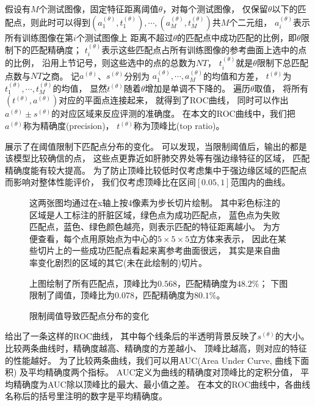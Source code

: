假设有$M$个测试图像，固定特征距离阈值$\theta$，对每个测试图像，
仅保留$\theta$以下的匹配点，则此时可以得到$(a_1^{(\theta)},
t_1^{(\theta)}),\cdots,(a_M^{(\theta)}, t_M^{(\theta)})$共$M$个二元组，
$a_i^{(\theta)}$表示所有训练图像在第$i$个测试图像上
距离不超过$\theta$的匹配点中成功匹配的比例，即$\theta$限制下的匹配精确度；
$t_i^{(\theta)}$表示这些匹配点占所有训练图像的参考曲面上选中的点的比例，
沿用上节记号，则这些选中的点的总数为$NT$，
$t_i^{(\theta)}$就是$\theta$限制下总匹配点数与$NT$之商。
记$a^{(\theta)}$、$s^{(\theta)}$分别为
$a_1^{(\theta)},\cdots,a_M^{(\theta)}$的均值和方差，
$t^{(\theta)}$为$t_1^{(\theta)},\cdots,t_M^{(\theta)}$的均值，
显然$t^{(\theta)}$随着$\theta$增加是单调不下降的。
遍历$\theta$取值，
将所有$(t^{(\theta)}, a^{(\theta)})$对应的平面点连接起来，
就得到了ROC曲线，
同时可以作出$a^{(\theta)} \pm s^{(\theta)}$的对应区域来反应评测的准确度。
在本文的ROC曲线中，我们把$a^{(\theta)}$称为精确度(precision)，
$t^{(\theta)}$称为顶峰比(top ratio)。

展示了在阈值限制下匹配点分布的变化。
可以发现，当限制阈值后，输出的都是该模型比较确信的点，
这些点更靠近如肝肺交界处等有强边缘特征的区域，
匹配精确度能有较大提高。
为了防止顶峰比较低时仅考虑集中于强边缘区域的匹配点而影响对整体性能评价，
我们仅考虑顶峰比在区间$[0.05, 1]$范围内的曲线。

\begin{figure}[H]
    {
        \caption{限制阈值导致匹配点分布的变化}
        \label{fig:expr:match}
    }
    \footnotesize
    这两张图均通过在x轴上按4像素为步长切片绘制。
    其中彩色标注的区域是人工标注的肝脏区域，绿色点为成功匹配点，
    蓝色点为失败匹配点，蓝色、绿色颜色越亮，则表示匹配的特征距离越小。
    为方便查看，每个点用原始点为中心的$5\times 5 \times 5$立方体来表示，
    因此在某些切片上的一些成功匹配点看起来离参考曲面很远，
    其实是来自曲率变化剧烈的区域的其它(未在此绘制的)切片。

    上图绘制了所有匹配点，顶峰比为$0.568$，匹配精确度为$48.2\%$；
    下图限制了阈值，顶峰比为$0.078$，匹配精确度为$80.1\%$。
\end{figure}

给出了一条这样的ROC曲线，
其中每个线条后的半透明背景反映了$s^{(\theta)}$的大小。
比较两条曲线时，精确度越高、精确度的方差越小、
顶峰比越高，则对应的特征的性能越好。
为了比较两条曲线，我们可以用AUC(Area Under Curve, 曲线下面积)
及平均精确度两个指标。
AUC定义为曲线的精确度对顶峰比的定积分值，
平均精确度为AUC除以顶峰比的最大、最小值之差。
在本文的ROC曲线中，各曲线名称后的括号里注明的数字是平均精确度。

